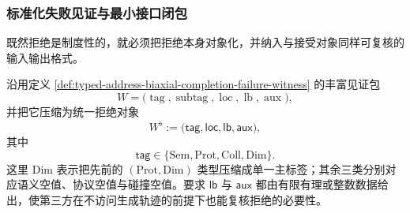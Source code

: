 \subsubsection{标准化失败见证与最小接口闭包}\label{subsubsec:typed-address-biaxial-completion-standardized-rejection}
既然拒绝是制度性的，就必须把拒绝本身对象化，并纳入与接受对象同样可复核的输入输出格式。

\begin{definition}[标准化失败见证的压缩格式]\label{def:typed-address-biaxial-completion-standardized-rejection}
沿用定义 \ref{def:typed-address-biaxial-completion-failure-witness} 的丰富见证包
\[
W=
\bigl(
\operatorname{tag},
\operatorname{subtag},
\operatorname{loc},
\operatorname{lb},
\operatorname{aux}
\bigr),
\]
并把它压缩为统一拒绝对象
\[
W^{\flat}:=
\bigl(
\mathsf{tag},
\mathsf{loc},
\mathsf{lb},
\mathsf{aux}
\bigr),
\]
其中
\[
\mathsf{tag}\in\{\mathrm{Sem},\mathrm{Prot},\mathrm{Coll},\mathrm{Dim}\}.
\]
这里 \(\mathrm{Dim}\) 表示把先前的 \((\mathrm{Prot},\mathrm{Dim})\) 类型压缩成单一主标签；其余三类分别对应语义空值、协议空值与碰撞空值。要求 \(\mathsf{lb}\) 与 \(\mathsf{aux}\) 都由有限有理或整数数据给出，使第三方在不访问生成轨迹的前提下也能复核拒绝的必要性。
\end{definition}

